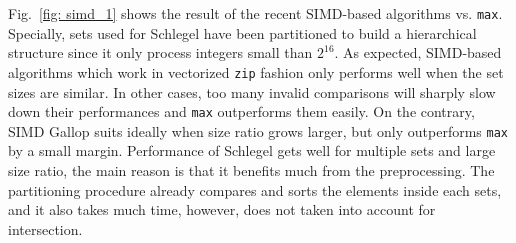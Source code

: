 \documentclass[runningheads,a4paper]{llncs}
\begin{document}
Fig.~\ref{fig: simd_1} shows the result of the recent SIMD-based algorithms vs. \texttt{max}.
Specially, sets used for Schlegel have been partitioned to build a hierarchical structure since it only process integers small than $ 2^{16} $.
As expected, SIMD-based algorithms which work in vectorized \texttt{zip} fashion only performs well when the set sizes are similar.
In other cases, too many invalid comparisons will sharply slow down their performances and \texttt{max} outperforms them easily.
On the contrary, SIMD Gallop suits ideally when size ratio grows larger, but only outperforms \texttt{max} by a small margin.
Performance of Schlegel gets well for multiple sets and large size ratio, the main reason is that it benefits much from the preprocessing.
The partitioning procedure already compares and sorts the elements inside each sets, and it also takes much time, however, does not taken into account for intersection. 
\end{document}
